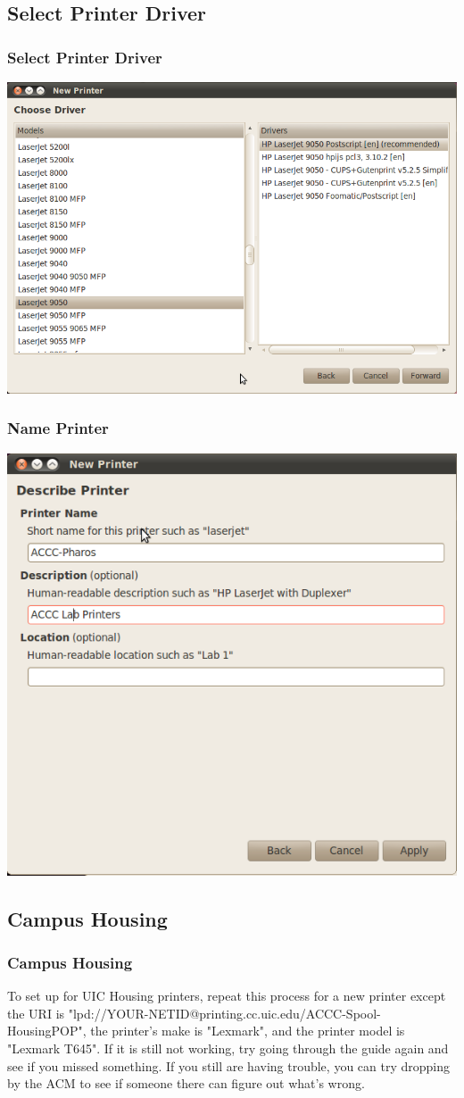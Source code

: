 \documentclass[hyperref={pdfpagelabels=false}]{beamer}
\begin{document}
\subsection{Select Printer Driver}
\frame
{
    \frametitle{Select Printer Driver}
     \includegraphics[totalheight=0.8\textheight]{PrinterDriver.png}
}
\frame
{
    \frametitle{Name Printer}
     \includegraphics[totalheight=0.8\textheight]{PrinterName.png}

}
\subsection{Campus Housing}
\frame
{
	\frametitle{Campus Housing}
	To set up for UIC Housing printers, repeat this process for a new printer except the URI is "lpd://YOUR-NETID@printing.cc.uic.edu/ACCC-Spool-HousingPOP", the printer's make is "Lexmark", and the printer model is "Lexmark T645". If it is still not working, try going through the guide again and see if you missed something. If you still are having trouble, you can try dropping by the ACM to see if someone there can figure out what's wrong. 
}
\end{document}
